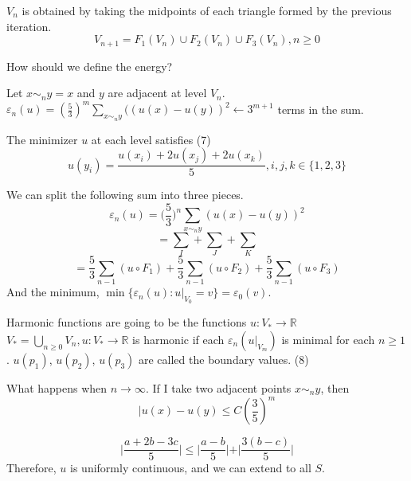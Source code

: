 \documentclass[12pt]{article}
\begin{document}
$V_n$ is obtained by taking the midpoints of each triangle formed by the previous iteration. 
$$V_{n+1} = F_1(V_n) \cup F_2(V_n) \cup F_3(V_n), n \geq 0$$

How should we define the energy?

Let $x \sim_n y = x$ and $y$ are adjacent at level $V_n$.
$\varepsilon_n(u) = (\frac{5}{3})^m \sum_{x \sim_n y} ((u(x)-u(y))^2 \leftarrow 3^{m+1}$ terms in the sum. 

The minimizer $u$ at each level satisfies 
(7)
$$u(y_i) = \frac{ u(x_i) + 2u(x_j) + 2u(x_k)}{5}, i,j,k \in \{1,2,3\}$$

We can split the following sum into three pieces. 
$$\varepsilon_n(u) = \Big(\frac{5}{3}\Big)^n \sum_{x \sim_n y} (u(x)-u(y))^2$$
$$=\sum_I + \sum_J + \sum_K$$
$$=\frac{5}{3}\sum_{n-1} (u \circ F_1) + \frac{5}{3}\sum_{n-1} (u \circ F_2) + \frac{5}{3}\sum_{n-1} (u \circ F_3)$$
And the minimum, $\min \{\varepsilon_n(u) : u\vert_{V_0} = v \} = \varepsilon_0(v)$.

Harmonic functions are going to be the functions $u: V_{*} \rightarrow \mathbb{R}$
$V_{*} = \bigcup_{n \geq 0} V_n, u : V_{*} \rightarrow \mathbb{R}$ is harmonic if each $\varepsilon_n(u\vert_{V_m})$ 
is minimal for each $n \geq 1$. $u(p_1)$, $u(p_2)$, $u(p_3)$ are called the boundary values. 
(8)


What happens when $n \rightarrow \infty$. If I take two adjacent points $x \sim_n y$, then 
$$\vert u(x) - u(y) \leq C (\frac{3}{5})^m$$

$$\vert \frac{a+2b-3c}{5} \vert \leq \vert \frac{a-b}{5} \vert + \vert \frac{3(b-c)}{5} \vert$$
Therefore, $u$ is uniformly continuous, and we can extend to all $S$. 
\end{document}
